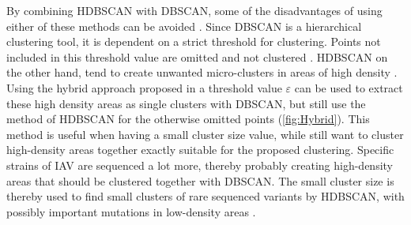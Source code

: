 By combining \gls{HDBSCAN} with \gls{DBSCAN}, some of the disadvantages of using either of these methods can be avoided \autocite{mcinnes_hdbscan_2017, moulavi_density-based_2014}. Since \gls{DBSCAN} is a hierarchical clustering tool, it is dependent on a strict threshold for clustering. Points not included in this threshold value are omitted and not clustered \autocite{ester_density-based_1996, schubert_dbscan_2017}. \gls{HDBSCAN} on the other hand, tend to create unwanted micro-clusters in areas of high density \autocite{mcinnes_hdbscan_2017}. Using the hybrid approach proposed in \autocite{malzer_hybrid_2020} a threshold value $\varepsilon$ can be used to extract these high density areas as single clusters with \gls{DBSCAN}, but still use the method of \gls{HDBSCAN} for the otherwise omitted points (\autoref{fig:Hybrid}). This method is useful when having a small cluster size value, while still want to cluster high-density areas together exactly suitable for the proposed clustering. Specific strains of \gls{IAV} are sequenced a lot more, thereby probably creating high-density areas that should be clustered together with \gls{DBSCAN}. The small cluster size is thereby used to find small clusters of rare sequenced variants by \gls{HDBSCAN}, with possibly important mutations in low-density areas \autocite{malzer_hybrid_2020}.


